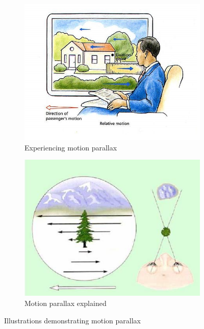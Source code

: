 \begin{figure}
	\centering
	\begin{subfigure}[h!]{0.4\textwidth}
		\includegraphics[width=\textwidth]{figures/cue8.jpg}
		\caption{Experiencing motion parallax \cite{Parallax0}}\label{fig:cue8}
	\end{subfigure}
	\begin{subfigure}[h!]{0.4\textwidth}
		\includegraphics[width=\textwidth]{figures/cue9.jpg}
		\caption{Motion parallax explained \cite{Skybrary}}\label{fig:cue9}
	\end{subfigure}
	\caption{Illustrations demonstrating motion parallax}
\end{figure}

